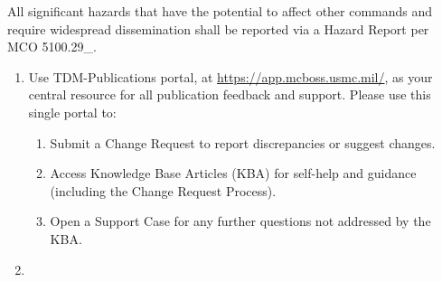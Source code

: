 {\begin{enumerate}[label=\arabic*., leftmargin=*, itemsep=12pt, topsep=0pt]
    \end{enumerate}
    \par\vspace{12pt}%
    \noindent All significant hazards that have the potential to affect other
    commands and require widespread dissemination shall be reported via a
    Hazard Report per MCO 5100.29\_.
    \par\vspace{12pt}%
    \begin{enumerate}[label=\arabic*., leftmargin=*, itemsep=12pt, topsep=0pt, start=3]
        \item Use TDM-Publications portal, at \href{https://app.mcboss.usmc.mil/}{https://app.mcboss.usmc.mil/}, as
              your central resource for all publication feedback and support.
              Please use this single portal to:
              \begin{enumerate}[label=\alph*., leftmargin=*, itemsep=6pt, topsep=6pt]
                  \item Submit a Change Request to report discrepancies or
                        suggest changes.
                  \item Access Knowledge Base Articles (KBA) for self-help and
                        guidance (including the Change Request Process).
                  \item Open a Support Case for any further questions not
                        addressed by the KBA.
              \end{enumerate}

        \item \dondocsAuthenticationContact
        \dondocsAuthenticationExtra


\end{enumerate}}
